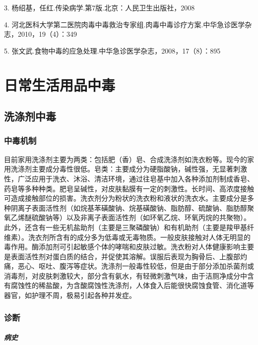 3. 杨绍基，任红.传染病学.第7版.北京：人民卫生出版社，2008

4.
河北医科大学第二医院肉毒中毒救治专家组.肉毒中毒诊疗方案.中华急诊医学杂志，2010，19（4）：349

5. 张文武.食物中毒的应急处理.中华急诊医学杂志，2008，17（8）：895

\protect\hypertarget{text00186.html}{}{}

\chapter{日常生活用品中毒}

\section{洗涤剂中毒}

\subsection{中毒机制}

目前家用洗涤剂主要为两类：包括肥（香）皂、合成洗涤剂如洗衣粉等。现今的家用洗涤剂主要成分毒性很低。皂类：主要成分为硬脂酸钠，碱性强，无显著刺激性，广泛应用于洗衣、沐浴、清洁环境，通过往皂基中加入各种添加剂制成香皂、药皂等多种种类。肥皂呈碱性，对皮肤黏膜有一定的刺激性。长时间、高浓度接触可造成接触部位的损害。洗衣剂分为粉状的洗衣粉和液状的洗衣水。主要成分是多种阴离子表面活性剂（如烷基苯磺酸钠、烷基磺酸钠、脂肪醇、硫酸钠、脂肪醇聚氧乙烯醚硫酸钠等）以及非离子表面活性剂（如环氧乙烷、环氧丙烷的共聚物）。此外，还含有一些无机盐助剂（主要是三聚磷酸钠）和有机助剂（主要是羧甲基纤维素）。洗衣剂所含有的成分多为低毒或无毒物质。一般皮肤接触对人体无明显的毒作用。酶添加剂可引起敏感个体的哮喘和皮肤过敏。洗衣粉对人体健康影响主要是表面活性剂对蛋白质的结合，并促使其溶解。误服后表现为胸骨后、上腹部灼痛，恶心、呕吐、腹泻等症状。洗涤剂一般毒性较低，但是由于部分添加杀菌剂或消毒剂，对皮肤刺激较大，部分含有氨水，有轻微刺激气味，由于洁厕净成分中含有腐蚀性的稀盐酸，为含酸腐蚀性洗涤剂，人体食入后能很快腐蚀食管、消化道等器官，如护理不周，极易引起各种并发症。

\subsection{诊断}

\paragraph{病史}

